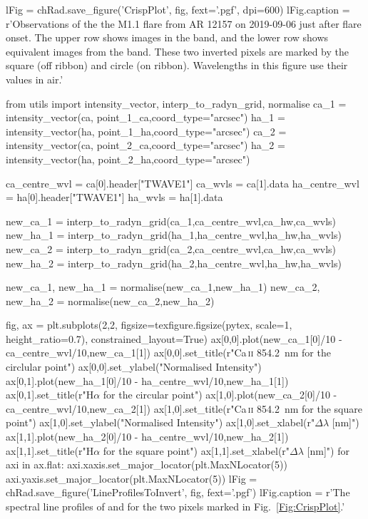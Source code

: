 \begin{pycode}[Radynversion]
lFig = chRad.save_figure('CrispPlot', fig, fext='.pgf', dpi=600)
lFig.caption = r'Observations of the the M1.1 flare from AR 12157 on 2019-09-06 just after flare onset. The upper row shows images in the \CaLine{} band, and the lower row shows equivalent images from the \Ha{} band. These two inverted pixels are marked by the square (off ribbon) and circle (on ribbon). Wavelengths in this figure use their values in air.'
\end{pycode}

\begin{pycode}[Radynversion]
from utils import intensity_vector, interp_to_radyn_grid, normalise
ca_1 = intensity_vector(ca, point_1_ca,coord_type="arcsec")
ha_1 = intensity_vector(ha, point_1_ha,coord_type="arcsec")
ca_2 = intensity_vector(ca, point_2_ca,coord_type="arcsec")
ha_2 = intensity_vector(ha, point_2_ha,coord_type="arcsec")

ca_centre_wvl = ca[0].header["TWAVE1"]
ca_wvls = ca[1].data
ha_centre_wvl = ha[0].header["TWAVE1"]
ha_wvls = ha[1].data

new_ca_1 = interp_to_radyn_grid(ca_1,ca_centre_wvl,ca_hw,ca_wvls)
new_ha_1 = interp_to_radyn_grid(ha_1,ha_centre_wvl,ha_hw,ha_wvls)
new_ca_2 = interp_to_radyn_grid(ca_2,ca_centre_wvl,ca_hw,ca_wvls)
new_ha_2 = interp_to_radyn_grid(ha_2,ha_centre_wvl,ha_hw,ha_wvls)

new_ca_1, new_ha_1 = normalise(new_ca_1,new_ha_1)
new_ca_2, new_ha_2 = normalise(new_ca_2,new_ha_2)

fig, ax = plt.subplots(2,2,
figsize=texfigure.figsize(pytex, scale=1, height_ratio=0.7),
constrained_layout=True)
ax[0,0].plot(new_ca_1[0]/10 - ca_centre_wvl/10,new_ca_1[1])
ax[0,0].set_title(r"Ca\,\textsc{ii} \SI{854.2}{\nano\metre} for the circlular point")
ax[0,0].set_ylabel("Normalised Intensity")
ax[0,1].plot(new_ha_1[0]/10 - ha_centre_wvl/10,new_ha_1[1])
ax[0,1].set_title(r"H$\alpha$ for the circular point")
ax[1,0].plot(new_ca_2[0]/10 - ca_centre_wvl/10,new_ca_2[1])
ax[1,0].set_title(r"Ca\,\textsc{ii} \SI{854.2}{\nano\metre} for the square point")
ax[1,0].set_ylabel("Normalised Intensity")
ax[1,0].set_xlabel(r"$\Delta\lambda$ [nm]")
ax[1,1].plot(new_ha_2[0]/10 - ha_centre_wvl/10,new_ha_2[1])
ax[1,1].set_title(r"H$\alpha$ for the square point")
ax[1,1].set_xlabel(r"$\Delta\lambda$ [nm]")
for axi in ax.flat:
    axi.xaxis.set_major_locator(plt.MaxNLocator(5))
    axi.yaxis.set_major_locator(plt.MaxNLocator(5))
lFig = chRad.save_figure('LineProfilesToInvert', fig, fext='.pgf')
lFig.caption = r'The spectral line profiles of \CaLine{} and \Ha{} for the two pixels marked in Fig.~\ref{Fig:CrispPlot}.'
\end{pycode}


